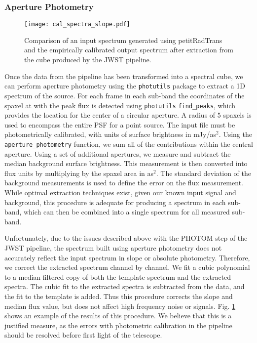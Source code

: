 \subsubsection{Aperture Photometry}
\begin{figure}[t]
	\texttt{[image: cal\_spectra\_slope.pdf]}
	\caption{Comparison of an input spectrum generated using petitRadTrans and the empirically calibrated output spectrum after extraction from the cube produced by the JWST pipeline.}
	\label{fig:cal}
\end{figure}
Once the data from the pipeline has been transformed into a spectral cube, we can perform aperture photometry using the \verb|photutils| package to extract a 1D spectrum of the source.
For each frame in each sub-band the coordinates of the spaxel at with the peak flux is detected using \verb|photutils| \verb|find_peaks|, which provides the location for the center of a circular aperture.
A radius of 5 spaxels is used to encompass the entire PSF for a point source.
The input file must be photometrically calibrated, with units of surface brightness in mJy/as$^{2}$.
Using the \verb|aperture_photometry| function, we sum all of the contributions within the central aperture.
Using a set of additional apertures, we measure and subtract the median background surface brightness.
This measurement is then converted into flux units by multiplying by the spaxel area in as$^{2}$.
The standard deviation of the background measurements is used to define the error on the flux measurement.
While optimal extraction techniques exist, given our known input signal and background, this procedure is adequate for producing a spectrum in each sub-band, which can then be combined into a single spectrum for all measured sub-band.

Unfortunately, due to the issues described above with the PHOTOM step of the JWST pipeline, the spectrum built using aperture photometry does not accurately reflect the input spectrum in slope or absolute photometry. 
Therefore, we correct the extracted spectrum channel by channel. 
We fit a cubic polynomial to a median filtered copy of both the template spectrum and the extracted spectra.
The cubic fit to the extracted spectra is subtracted from the data, and the fit to the template is added. 
Thus this procedure corrects the slope and median flux value, but does not affect high frequency noise or signals.
Fig. \ref{fig:cal} shows an example of the results of this procedure. 
We believe that this is a justified measure, as the errors with photometric calibration in the pipeline should be resolved before first light of the telescope.

